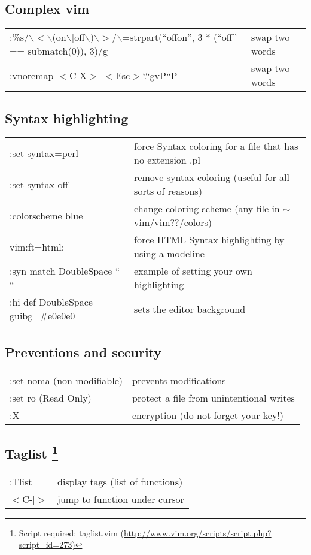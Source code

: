 \documentclass[10pt]{article}
\begin{document}
\subsection*{Complex vim}
\begin{center}
\begin{longtable}{l|l}
:\%s/$\backslash$$<$$\backslash$(on$\backslash$$|$off$\backslash$)$\backslash$$>$/$\backslash$=strpart(``offon'', 3 * (``off'' == submatch(0)), 3)/g & swap two words\\ 
:vnoremap $<$C-X$>$ $<$Esc$>$`.``gvP``P & swap two words
\end{longtable}
\end{center} 

\subsection*{Syntax highlighting}
\begin{center}
\begin{longtable}{l|l}
 :set syntax=perl & force Syntax coloring for a file that has no extension .pl\\ 
 :set syntax off & remove syntax coloring (useful for all sorts of reasons)\\ 
 :colorscheme blue & change coloring scheme (any file in $\sim$vim/vim??/colors)\\ 
 vim:ft=html: & force HTML Syntax highlighting by using a modeline\\ 
 :syn match DoubleSpace `` `` & example of setting your own highlighting\\ 
 :hi def DoubleSpace guibg=\#e0e0e0 & sets the editor background
\end{longtable}
\end{center} 

\subsection*{Preventions and security}
\begin{center}
\begin{longtable}{l|l}
 :set noma (non modifiable) & prevents modifications\\ 
 :set ro (Read Only) & protect a file from unintentional writes\\ 
 :X & encryption (do not forget your key!)
\end{longtable}
\end{center} 

\subsection*{Taglist \footnote{Script required: taglist.vim (\url{http://www.vim.org/scripts/script.php?script_id=273)}}} 
\begin{center}
\begin{longtable}{l|l}
:Tlist & display tags (list of functions)\\ 
$<$C-]$>$  & jump to function under cursor
\end{longtable}
\end{center} 
\end{document}
